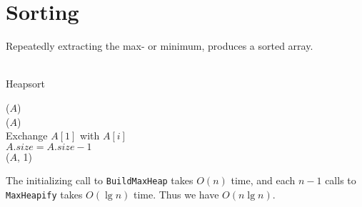 \section{Sorting}
Repeatedly extracting the max- or minimum, produces a sorted array.\\\\
\begin{algorithm}[H]
	\caption{Heapsort}
	\label{alg:heapsort}





	\BlankLine
	\HeapSort($A$) \\
	\Begin
	{
		\BuildMaxHeap($A$) \\
		{
			Exchange $A[1]$ with $A[i]$ \\
			$A.size = A.size - 1$ \\
			\MaxHeapify($A$, 1)
		}
	}
\end{algorithm}

The initializing call to \texttt{BuildMaxHeap} takes $O(n)$ time, and each
$n-1$ calls to \texttt{MaxHeapify} takes $O(\lg n)$ time. Thus we have
$O(n \lg n)$.

